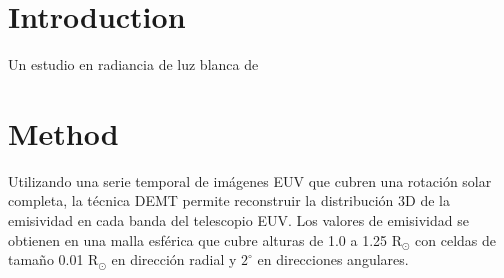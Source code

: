 \documentclass[baaa]{baaa}
\begin{document}
\maketitle

\section{Introduction}
\label{intro}


Un estudio en radiancia de luz blanca de \cite{awsom}%

\section{Method}

Utilizando una serie temporal de imágenes EUV que cubren una rotación solar completa, la técnica DEMT permite reconstruir la distribución 3D de la emisividad en cada banda del telescopio EUV. Los valores de emisividad se obtienen en una malla esférica que cubre alturas de 1.0 a 1.25 R$_\odot$ con celdas de tamaño 0.01 R$_\odot$ en dirección radial y $2^\circ$ en direcciones angulares.

\end{document}
